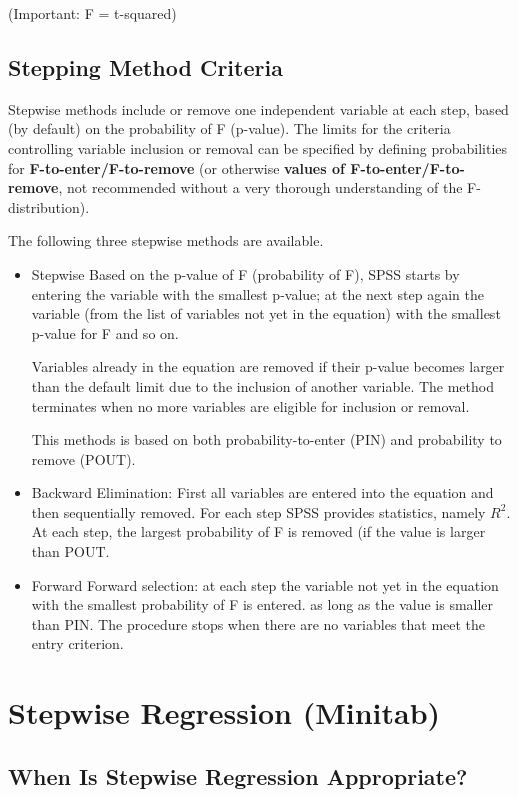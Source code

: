 \documentclass[a4paper,12pt]{article}
\begin{document}
(Important: F = t-squared)

\subsection{Stepping Method Criteria}
Stepwise methods include or remove one independent variable at each step, based (by default) on the probability of F (p-value). The limits for the criteria controlling variable inclusion or removal can be specified by defining probabilities for \textbf{F-to-enter/F-to-remove} (or otherwise \textbf{values of F-to-enter/F-to-remove}, not recommended without a very thorough understanding of the F-distribution).




The following three stepwise methods are available.

\begin{itemize}
\item Stepwise Based on the p-value of F (probability of F), SPSS starts by entering the variable with the smallest p-value; at the next step again the variable (from the list of variables not yet in the equation) with the smallest p-value for F and so on. 
    
    Variables already in the equation are removed if their p-value becomes larger than the default limit due to the inclusion of another variable. The method terminates when no more variables are eligible for inclusion or removal.	
    
    This methods is based on both probability-to-enter (PIN) and probability to remove (POUT).
\item Backward Elimination: First all variables are entered into the equation and then sequentially removed. For each step SPSS provides statistics, namely $R^2$. At each step, the largest probability of F is removed (if the value is larger than POUT.
\item Forward Forward selection: at each step the variable not yet in the equation with the smallest probability of F is entered. as long as the value is smaller than PIN. The procedure stops when there are no variables that meet the entry criterion.
\end{itemize}
\newpage
\section{Stepwise Regression (Minitab)}

\subsection*{When Is Stepwise Regression Appropriate?}
\end{document}
